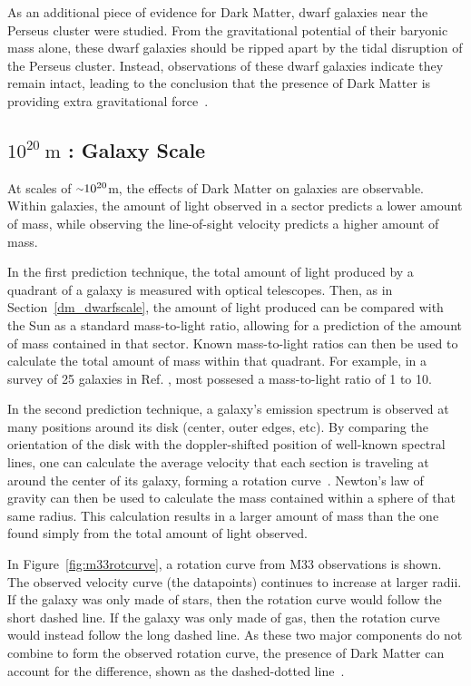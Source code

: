     As an additional piece of evidence for Dark Matter, dwarf galaxies near the Perseus cluster were studied.
    From the gravitational potential of their baryonic mass alone, these dwarf galaxies should be ripped apart by the tidal disruption of the Perseus cluster.
    Instead, observations of these dwarf galaxies indicate they remain intact, leading to the conclusion that the presence of Dark Matter is providing extra gravitational force~\cite{Penny2009}.
    
    \FloatBarrier

  \subsection{$10^{20}\:\text{m}$ : Galaxy Scale}
    At scales of $\nicetilde 10^{20}$m, the effects of Dark Matter on galaxies are observable.
    Within galaxies, the amount of light observed in a sector predicts a lower amount of mass, while observing the line-of-sight velocity predicts a higher amount of mass.
    
    In the first prediction technique, the total amount of light produced by a quadrant of a galaxy is measured with optical telescopes.
    Then, as in Section~\ref{dm_dwarfscale}, the amount of light produced can be compared with the Sun as a standard mass-to-light ratio, allowing for a prediction of the amount of mass contained in that sector.
    Known mass-to-light ratios can then be used to calculate the total amount of mass within that quadrant.
    For example, in a survey of 25 galaxies in Ref. \cite{galaxy_mass_light_ratio}, most possesed a mass-to-light ratio of 1 to 10.

    In the second prediction technique, a galaxy's emission spectrum is observed at many positions around its disk (center, outer edges, etc).
    By comparing the orientation of the disk with the doppler-shifted position of well-known spectral lines, one can calculate the average velocity that each section is traveling at around the center of its galaxy, forming a rotation curve~\cite{rotation_curve_review,spiral_galaxy_rot_curve,milkyway_dm_evidence}.
    Newton's law of gravity can then be used to calculate the mass contained within a sphere of that same radius.
    This calculation results in a larger amount of mass than the one found simply from the total amount of light observed.
    
    In Figure~\ref{fig:m33rotcurve}, a rotation curve from M33 observations is shown.
    The observed velocity curve (the datapoints) continues to increase at larger radii.
    If the galaxy was only made of stars, then the rotation curve would follow the short dashed line.
    If the galaxy was only made of gas, then the rotation curve would instead follow the long dashed line.
    As these two major components do not combine to form the observed rotation curve, the presence of Dark Matter can account for the difference, shown as the dashed-dotted line~\cite{m33rotcurve}.
    
